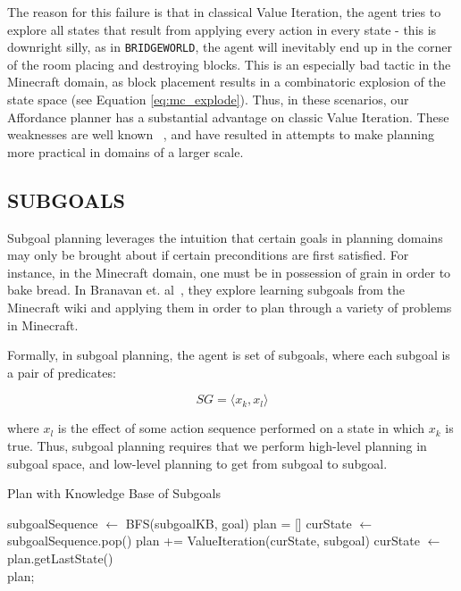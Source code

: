 \documentclass[]{article}
\begin{document}
The reason for this failure is that in classical Value Iteration, the agent tries to 
explore all states that result from applying every action in every state - this is downright silly, 
as in \texttt{BRIDGEWORLD}, the agent will inevitably end up in the corner of the 
room placing and destroying blocks. This is an especially bad tactic in the Minecraft 
domain, as block placement results in a combinatoric explosion of the state space 
(see Equation \ref{eq:mc_explode}). Thus, in these scenarios, our Affordance planner 
has a substantial advantage on classic Value Iteration. These weaknesses are well 
known ~\citep{grounds05}, and have resulted in attempts to make planning more 
practical in domains of a larger scale.


\subsection{SUBGOALS}
Subgoal planning leverages the intuition that certain goals in planning domains 
may only be brought about if certain preconditions are first satisfied. For instance, 
in the Minecraft domain, one must be in possession of grain in order to bake bread. 
In Branavan et. al~\citep{branavan12a}, they explore learning subgoals from the 
Minecraft wiki and applying them in order to plan through a variety of problems in Minecraft.

Formally, in subgoal planning, the agent is set of subgoals, where each subgoal is a pair of predicates:

\[ 
SG = \langle x_k, x_l \rangle
\]

where $x_l$ is the effect of some action sequence performed on 
a state in which $x_k$ is true. Thus, subgoal planning requires 
that we perform high-level planning in subgoal space, and low-level 
planning to get from subgoal to subgoal.

\begin{algorithm}
  \caption{Plan with Knowledge Base of Subgoals}
  \begin{algorithmic}[1]
    \State subgoalSequence $\gets$ BFS(subgoalKB, goal)
    \State plan = []
    \State curState $\gets$ subgoalSequence.pop()
    		\State plan += ValueIteration(curState, subgoal)
		\State curState $\gets$ plan.getLastState()
    \EndFor \\
    \Return plan;
  \end{algorithmic}
\end{algorithm}
\end{document}

